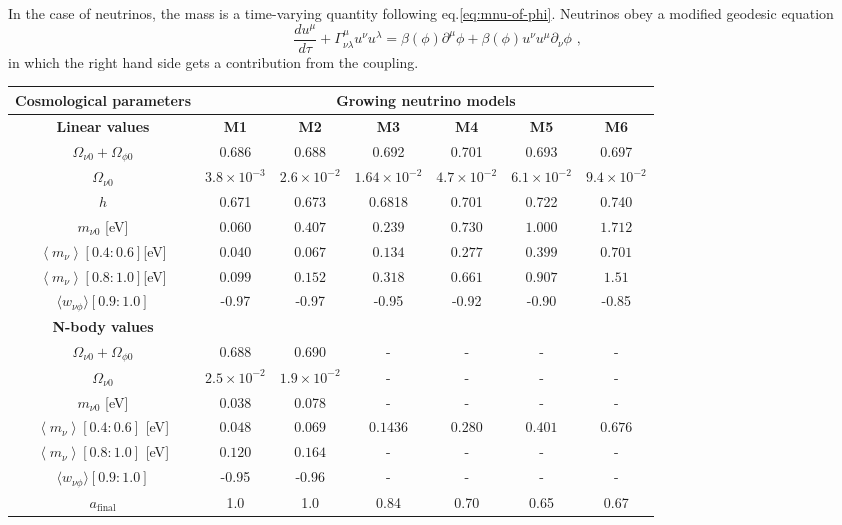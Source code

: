 In the case of neutrinos, the mass is a time-varying quantity following
eq.\ref{eq:mnu-of-phi}. Neutrinos obey a modified geodesic
equation 
\begin{equation}
\frac{du^{\mu}}{d\tau}+\Gamma_{\nu\lambda}^{\mu}u^{\nu}u^{\lambda}=\beta(\phi)\partial^{\mu}\phi+\beta(\phi)u^{\nu}u^{\mu}\partial_{\nu}\phi\,\,,
\end{equation}
in which the right hand side gets a contribution from the coupling.

\begin{table}
\centering{}%
\footnotesize
\begin{tabular}{|c|c|c|c|c|c|c|}
\hline 
\textbf{Cosmological parameters}  & \multicolumn{6}{c|}{\textbf{Growing neutrino models}}\tabularnewline
\hline 
\textbf{{Linear values} }  & \textbf{{M1} }  & \textbf{{M2} }  & \textbf{{M3} }  & \textbf{{M4} }  & \textbf{{M5} }  & \textbf{{M6}}\tabularnewline
\hline 
\hline 
$\Omega_{\nu0}+\Omega_{\phi0}$  & 0.686  & 0.688  & 0.692  & 0.701  & 0.693  & 0.697\tabularnewline
\hline 
$\Omega_{\nu0}$  & $3.8\times10^{-3}$  & $2.6\times10^{-2}$  & $1.64\times10^{-2}$  & $4.7\times10^{-2}$  & $6.1\times10^{-2}$  & $9.4\times10^{-2}$\tabularnewline
\hline 
$h$  & 0.671  & 0.673  & 0.6818  & 0.701  & 0.722  & 0.740\tabularnewline
\hline 
$m_{\nu0}$ {[}eV{]}  & $0.060$  & $0.407$  & $0.239$  & $0.730$  & $1.000$  & $1.712$\tabularnewline
\hline 
$\left\langle m_{\nu}\right\rangle $$[0.4:0.6]${[}eV{]}  & $0.040$  & $0.067$  & $0.134$  & $0.277$  & $0.399$  & $0.701$\tabularnewline
\hline 
$\left\langle m_{\nu}\right\rangle $$[0.8:1.0]${[}eV{]}  & $0.099$  & $0.152$  & $0.318$  & $0.661$  & $0.907$  & $1.51$\tabularnewline
\hline 
$\langle w_{\nu\phi}\rangle[0.9:1.0]$  & -0.97  & -0.97  & -0.95  & -0.92  & -0.90  & -0.85\tabularnewline
\hline 
\hline 
\textbf{{N-body values} }  &  &  &  &  &  & \tabularnewline
\hline 
\hline 
$\Omega_{\nu0}+\Omega_{\phi0}$  & 0.688  & 0.690  & -  & -  & -  & -\tabularnewline
\hline 
$\Omega_{\nu0}$  & $2.5\times10^{-2}$  & $1.9\times10^{-2}$  & -  & -  & -  & -\tabularnewline
\hline 
$m_{\nu0}$ {[}eV{]}  & 0.038  & 0.078  & -  & -  & -  & -\tabularnewline
\hline 
$\left\langle m_{\nu}\right\rangle [0.4:0.6]$ {[}eV{]}  & $0.048$  & $0.069$  & $0.1436$  & $0.280$  & $0.401$  & $0.676$\tabularnewline
\hline 
$\left\langle m_{\nu}\right\rangle [0.8:1.0]$ {[}eV{]}  & $0.120$  & $0.164$  & -  & -  & -  & -\tabularnewline
\hline 
$\langle w_{\nu\phi}\rangle[0.9:1.0]$  & -0.95  & -0.96  & -  & -  & -  & -\tabularnewline
\hline 
$a_{\text{final}}$  & 1.0  & 1.0  & 0.84  & 0.70  & 0.65  & 0.67\tabularnewline

\end{tabular}
\end{table}
